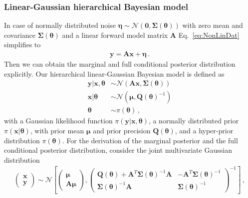 \subsubsection{Linear-Gaussian hierarchical Bayesian model}
\label{subsec:LinBay}
In case of normally distributed noise $\bm{\eta} \sim \mathcal{N}(\bm{0},\bm{\Sigma}(\bm{\theta}))$ with zero mean and covariance $\bm{\Sigma}(\bm{\theta})$ and a linear forward model matrix $\bm{A}$ Eq.~\ref{eq:NonLinDat} simplifies to
\begin{align}
	\bm{y} = \bm{A} \bm{x} + \bm{\eta} \, .
	\label{eq:LinDat}
\end{align}
Then we can obtain the marginal and full conditional posterior distribution explicitly.
Our hierarchical linear-Gaussian Bayesian model is defined as
\begin{subequations}
	\label{eq:GenBayMode}
	\begin{align}
		\bm{y} |  \bm{x}, \bm{\theta} &\sim \mathcal{N}(\bm{A} \bm{x}, \bm{\Sigma}(\bm{\theta}) ) \\
		\bm{x} |  \bm{\theta} &\sim \mathcal{N}(\bm{\mu}, \bm{Q}(\bm{\theta})^{-1} ) \\
		\bm{\theta} &\sim \pi(\bm{\theta}) \,  ,
	\end{align}
\end{subequations}
with a Gaussian likelihood function $\pi(\bm{y} | \bm{x}, \bm{\theta} )$, a normally distributed prior $\pi(\bm{x}|\bm{\theta})$, with prior mean $\bm{\mu}$ and prior precision $\bm{Q}(\bm{\theta})$, and a hyper-prior distribution $\pi(\bm{\theta})$.
For the derivation of the marginal posterior and the full conditional posterior distribution, consider the joint multivariate Gaussian distribution
\begin{align}
	\begin{pmatrix}
		\bm{x} \\
		\bm{y}
	\end{pmatrix}\sim \mathcal{N}\left[  \begin{pmatrix}
		\bm{\mu} \\
		\bm{A}\bm{\mu}
	\end{pmatrix},\begin{pmatrix}
		\bm{Q}(\bm{\theta}) + \bm{A}^T \bm{\Sigma}(\bm{\theta})^{-1} \bm{A} & - \bm{A}^T \bm{\Sigma}(\bm{\theta})^{-1} \\
		\bm{\Sigma}(\bm{\theta})^{-1} \bm{A} & \bm{\Sigma}(\bm{\theta})^{-1} 
	\end{pmatrix}^{-1} \right] \, , 	\label{eq:jointMultiGaus}
\end{align}
